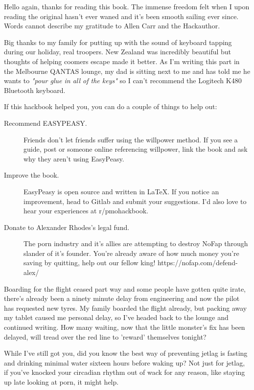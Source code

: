 \documentclass[easypeasy.tex]{subfiles}
\begin{document}
Hello again, thanks for reading this book. The immense freedom felt when I upon reading the original hasn't ever waned and it's been smooth sailing ever since. Words cannot describe my gratitude to Allen Carr and the Hackauthor. 

Big thanks to my family for putting up with the sound of keyboard tapping during our holiday, real troopers. New Zealand was incredibly beautiful but thoughts of helping coomers escape made it better. As I'm writing this part in the Melbourne QANTAS lounge, my dad is sitting next to me and has told me he wants to \textit{"pour glue in all of the keys"} so I can't recommend the Logitech K480 Bluetooth keyboard.

If this hackbook helped you, you can do a couple of things to help out:
  \begin{description}
  \item [Recommend EASYPEASY.] Friends don't let friends suffer using the willpower method. If you see a guide, post or someone online referencing willpower, link the book and ask why they aren't using EasyPeasy.

  \item [Improve the book.] EasyPeasy is open source and written in LaTeX. If you notice an improvement, head to Gitlab and submit your suggestions. I'd also love to hear your experiences at r/pmohackbook.

  \item [Donate to Alexander Rhodes's legal fund.] The porn industry and it's allies are attempting to destroy NoFap through slander of it's founder. You're already aware of how much money you're saving by quitting, help out our fellow king! https://nofap.com/defend-alex/
  \end{description}

Boarding for the flight ceased part way and some people have gotten quite irate, there's already been a ninety minute delay from engineering and now the pilot has requested new tyres. My family boarded the flight already, but packing away my tablet caused me personal delay, so I've headed back to the lounge and continued writing. How many waiting, now that the little monster's fix has been delayed, will tread over the red line to 'reward' themselves tonight?

While I've still got you, did you know the best way of preventing jetlag is fasting and drinking minimal water sixteen hours before waking up? Not just for jetlag, if you've knocked your circadian rhythm out of wack for any reason, like staying up late looking at porn, it might help.
\end{document}
